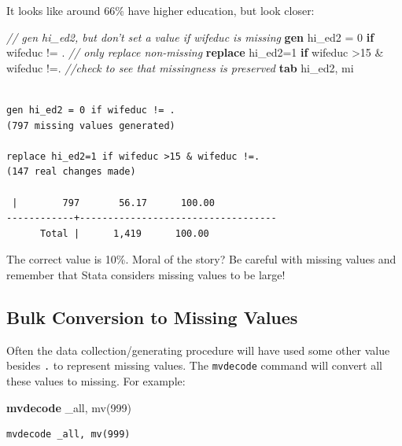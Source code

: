 \documentclass[
]{book}
\newenvironment{Shaded}{\begin{snugshade}}{\end{snugshade}}
\newcommand{\CommentTok}[1]{\textcolor[rgb]{0.56,0.35,0.01}{\textit{#1}}}
\newcommand{\DataTypeTok}[1]{\textcolor[rgb]{0.13,0.29,0.53}{#1}}
\newcommand{\FunctionTok}[1]{\textcolor[rgb]{0.00,0.00,0.00}{#1}}
\newcommand{\KeywordTok}[1]{\textcolor[rgb]{0.13,0.29,0.53}{\textbf{#1}}}
\newcommand{\NormalTok}[1]{#1}
\begin{document}
It looks like around 66\% have higher education, but look closer:

\begin{Shaded}
\begin{Highlighting}[]
  \CommentTok{// gen hi_ed2, but don't set a value if wifeduc is missing}
  \KeywordTok{gen}\NormalTok{ hi_ed2 = 0 }\KeywordTok{if}\NormalTok{ wifeduc != . }
  \CommentTok{// only replace non-missing}
  \KeywordTok{replace}\NormalTok{ hi_ed2=1 }\KeywordTok{if}\NormalTok{ wifeduc >15 & wifeduc !=. }
  \CommentTok{//check to see that missingness is preserved}
  \KeywordTok{tab}\NormalTok{ hi_ed2, }\FunctionTok{mi}
\end{Highlighting}
\end{Shaded}

\begin{verbatim}

gen hi_ed2 = 0 if wifeduc != . 
(797 missing values generated)

replace hi_ed2=1 if wifeduc >15 & wifeduc !=. 
(147 real changes made)

 |        797       56.17      100.00
------------+-----------------------------------
      Total |      1,419      100.00
\end{verbatim}

The correct value is 10\%. Moral of the story? Be careful with missing values and remember that Stata considers missing values to be large!

\hypertarget{bulk-conversion-to-missing-values}{%
\subsection{Bulk Conversion to Missing Values}\label{bulk-conversion-to-missing-values}}

Often the data collection/generating procedure will have used some other value besides \texttt{.} to represent missing values. The \texttt{mvdecode} command will convert all these values to missing. For example:

\begin{Shaded}
\begin{Highlighting}[]
  \KeywordTok{mvdecode} \DataTypeTok{_all}\NormalTok{, mv(999)}
\end{Highlighting}
\end{Shaded}

\begin{verbatim}
mvdecode _all, mv(999)
\end{verbatim}
\end{document}
